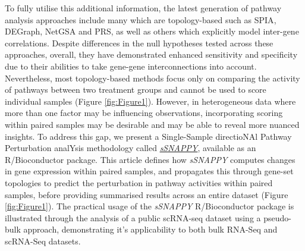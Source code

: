 \documentclass[9pt,a4paper,]{extarticle}
\begin{document}
To fully utilise this additional information, the latest generation of pathway analysis approaches include many which are topology-based such as SPIA\citep{Tarca2009}, DEGraph\citep{Jacob2012}, NetGSA\citep{Ma2016} and PRS\citep{Ibrahim2012}, as well as others which explicitly model inter-gene correlations\citep{Wu2012}.
Despite differences in the null hypotheses tested across these approaches, overall, they have demonstrated enhanced sensitivity and specificity due to their abilities to take gene-gene interconnections into account\citep{Nguyen2019-va, Ma2019}.
Nevertheless, most topology-based methods focus only on comparing the activity of pathways between two treatment groups and cannot be used to score individual samples (Figure \ref{fig:Figure1}).
However, in heterogeneous data where more than one factor may be influencing observations\citep{Hanzelmann2013}, incorporating scoring within paired samples may be desirable and may be able to reveal more nuanced insights.
To address this gap, we present a Single-Sample directioNAl Pathway Perturbation analYsis methodology called \href{https://bioconductor.org/packages/sSNAPPY}{\emph{sSNAPPY}}, available as an R/Bioconductor package.
This article defines how \emph{sSNAPPY} computes changes in gene expression within paired samples, and propagates this through gene-set topologies to predict the perturbation in pathway activities within paired samples, before providing summarised results across an entire dataset (Figure \ref{fig:Figure1}).
The practical usage of the \emph{sSNAPPY} R/Bioconductor package is illustrated through the analysis of a public scRNA-seq dataset using a pseudo-bulk approach, demonstrating it's applicability to both bulk RNA-Seq and scRNA-Seq datasets.
\end{document}

